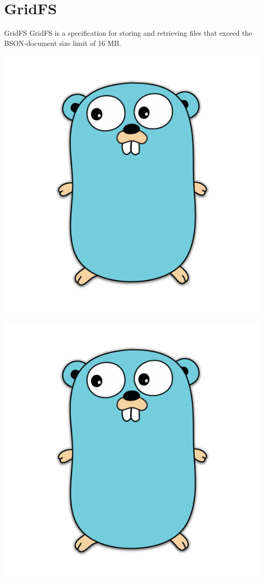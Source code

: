\documentclass{beamer}
\begin{document}
\section{GridFS}
\begin{frame}{GridFS}
GridFS is a specification for storing and retrieving files that exceed the BSON-document size limit of 16 MB.

\vspace{0.04\textheight}

\begin{minipage}[t]{0.3\textwidth}
\includegraphics[width=\textwidth]{golang}
\end{minipage}

\hfill
\begin{minipage}[t]{0.3\textwidth}
\includegraphics[width=\textwidth]{golang}
\end{minipage}


\end{frame}
\end{document}

